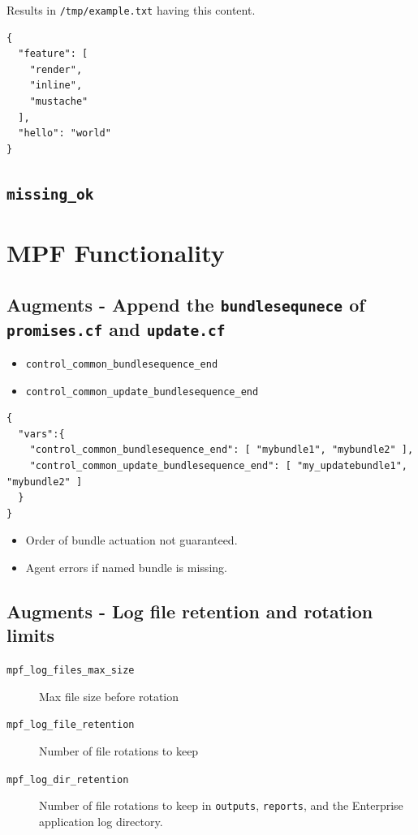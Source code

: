 \documentclass[11pt]{article}
\begin{document}
Results in \texttt{/tmp/example.txt} having this content.

\begin{verbatim}
{
  "feature": [
    "render",
    "inline",
    "mustache"
  ],
  "hello": "world"
}
\end{verbatim}

\subsection*{\texttt{missing\_ok}}
\label{sec:orgaddf09f}
\section*{MPF Functionality}
\label{sec:org9dd1ac8}
\subsection*{Augments - Append the \texttt{bundlesequnece} of \texttt{promises.cf} and \texttt{update.cf}}
\label{sec:orgb7736d7}

\begin{itemize}
\item \texttt{control\_common\_bundlesequence\_end}
\item \texttt{control\_common\_update\_bundlesequence\_end}
\end{itemize}

\begin{verbatim}
{
  "vars":{
    "control_common_bundlesequence_end": [ "mybundle1", "mybundle2" ],
    "control_common_update_bundlesequence_end": [ "my_updatebundle1", "mybundle2" ]
  }
}
\end{verbatim}

\begin{itemize}
\item Order of bundle actuation not guaranteed.
\item Agent errors if named bundle is missing.
\end{itemize}

\subsection*{Augments - Log file retention and rotation limits}
\label{sec:org0bafe46}

\begin{description}
\item[{\texttt{mpf\_log\_files\_max\_size}}] Max file size before rotation
\item[{\texttt{mpf\_log\_file\_retention}}] Number of file rotations to keep
\item[{\texttt{mpf\_log\_dir\_retention}}] Number of file rotations to keep in \texttt{outputs},
\texttt{reports}, and the Enterprise application log directory.
\end{description}
\end{document}
